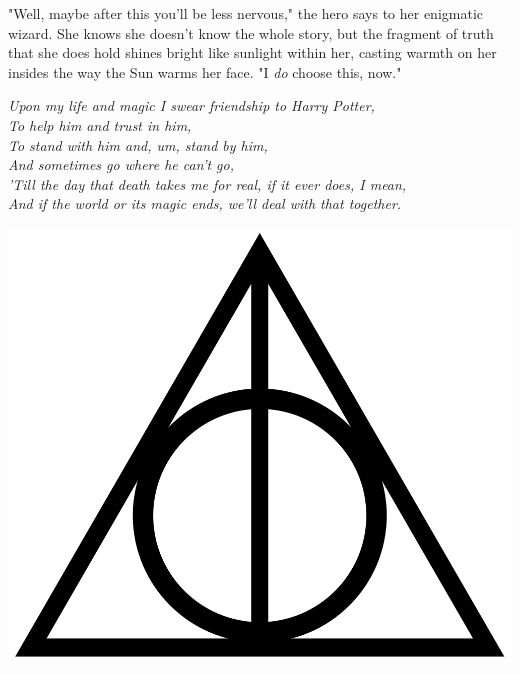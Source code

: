 "Well, maybe after this you'll be less nervous," the hero says to her enigmatic
wizard. She knows she doesn't know the whole story, but the fragment of truth
that she does hold shines bright like sunlight within her, casting warmth on
her insides the way the Sun warms her face. "I \emph{do} choose this, now."

\begin{samepage}
\noindent{}\emph{Upon my life and magic I swear friendship to Harry Potter,}\\
\emph{To help him and trust in him,}\\
\emph{To stand with him and, um, stand by him,}\\
\emph{And sometimes go where he can't go,}\\
\emph{'Till the day that death takes me for real, if it ever does, I mean,}\\
\emph{And if the world or its magic ends, we'll deal with that together.}

\vspace*{2\baselineskip}

\begin{center}
\includegraphics[scale=0.125]{Deathly_Hallows_Sign.png}
\end{center}
\end{samepage}

\clearpage
